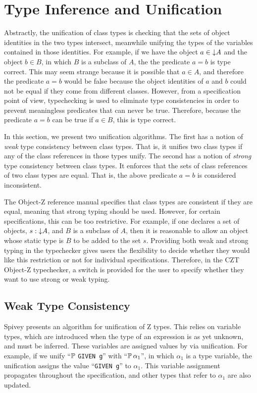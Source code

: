 \section{Type Inference and Unification}
\label{inference}

Abstractly, the unification of class types is checking that the sets
of object identities in the two types intersect, meanwhile unifying
the types of the variables contained in those identities. For example,
if we have the object $a \in \mathord\downarrow A$ and the object $b \in B$, in
which $B$ is a subclass of $A$, the the predicate $a = b$ is type
correct. This may seem strange because it is possible that $a \in A$,
and therefore the predicate $a = b$ would be false because the object
identities of $a$ and $b$ could not be equal if they come from
different classes.  However, from a specification point of view,
typechecking is used to eliminate type consistencies in order to
prevent meaningless predicates that can never be true. Therefore,
because the predicate $a = b$ can be true if $a \in B$, this is type
correct.

In this section, we present two unification algorithms. The first has
a notion of {\em weak} type consistency between class types. That is,
it unifies two class types if any of the class references in those
types unify. The second has a notion of {\em strong} type consistency
between class types. It enforces that the sets of class references of
two class types are equal. That is, the above predicate $a = b$ is
considered inconsistent.

The Object-Z reference manual \cite{smith00} specifies that class
types are consistent if they are equal, meaning that strong typing
should be used.  However, for certain specifications, this can be too
restrictive. For example, if one declares a set of objects, $s : \mathord\downarrow
A$, and $B$ is a subclass of $A$, then it is reasonable to allow an
object whose static type is $B$ to be added to the set $s$. Providing
both weak and strong typing in the typechecker gives users the
flexibility to decide whether they would like this restriction or not
for individual specifications. Therefore, in the CZT Object-Z
typechecker, a switch is provided for the user to specify whether they
want to use strong or weak typing.

\subsection{Weak Type Consistency}

Spivey \cite{spivey90} presents an algorithm for unification of Z
types. This relies on variable types, which are introduced when the
type of an expression is as yet unknown, and must be
inferred. These variables are assigned values by via unification. For
example, if we unify ``$\power$ {\tt GIVEN g}'' with ``$\power \alpha_1$'', in
which $\alpha_1$ is a type variable, the unification assigns the value
``{\tt GIVEN g}'' to $\alpha_1$. This variable assignment propagates
throughout the specification, and other types that refer to $\alpha_1$
are also updated.


